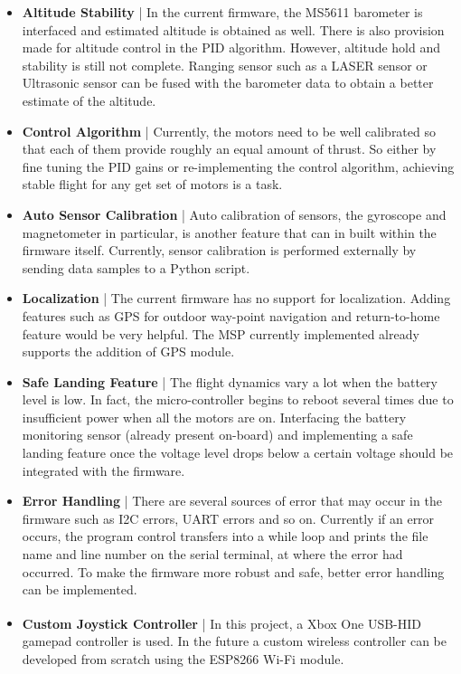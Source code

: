 \documentclass[a4paper,12pt,oneside]{book}
\begin{document}
\begin{itemize}
\item \textbf{Altitude Stability} | In the current firmware, the MS5611 barometer is interfaced and estimated altitude is obtained as well. There is also provision made for altitude control in the PID algorithm. However, altitude hold and stability is still not complete. Ranging sensor such as a LASER sensor or Ultrasonic sensor can be fused with the barometer data to obtain a better estimate of the altitude.\\

\item \textbf{Control Algorithm} | Currently, the motors need to be well calibrated so that each of them provide roughly an equal amount of thrust. So either by fine  tuning the PID gains or re-implementing the control algorithm, achieving stable flight for any get set of motors is a task.\\

\item \textbf{Auto Sensor Calibration} | Auto calibration of sensors, the gyroscope and magnetometer in particular, is another feature that can in built within the firmware itself. Currently, sensor calibration is performed externally by sending data samples to a Python script.

\item \textbf{Localization} | The current firmware has no support for localization. Adding features such as GPS for outdoor way-point navigation and return-to-home feature would be very helpful. The MSP currently implemented already supports the addition of GPS module.\\

\item \textbf{Safe Landing Feature} | The flight dynamics vary a lot when the battery level is low. In fact, the micro-controller begins to reboot several times due to insufficient power when all the motors are on. Interfacing the battery monitoring sensor (already present on-board) and implementing a safe landing feature once the voltage level drops below a certain voltage should be integrated with the firmware.\\

\item \textbf{Error Handling} | There are several sources of error that may occur in the firmware such as I2C errors, UART errors and so on. Currently if an error occurs, the program control transfers into a while loop and prints the file name and line number on the serial terminal, at where the error had occurred. To make the firmware more robust and safe, better error handling can be implemented.\\  

\item \textbf{Custom Joystick Controller} | In this project, a Xbox\textsuperscript{\textregistered} One \cite{xbox} USB-HID gamepad controller is used. In the future a custom wireless controller can be developed from scratch using the ESP8266 Wi-Fi module.

\end{itemize}
\end{document}
